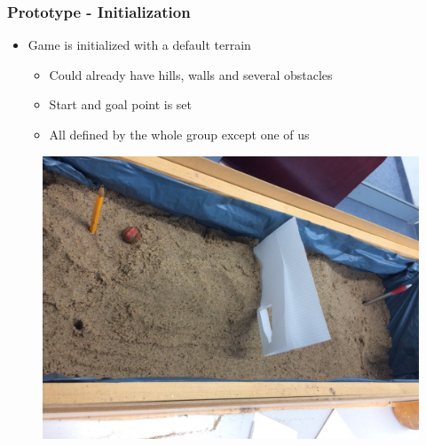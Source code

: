 \documentclass[xcolor=dvipsnames]{beamer}
\begin{document}
	\begin{frame}
		\frametitle{Prototype - Initialization}
		\begin{itemize}
			\setlength\itemsep{1.5em}
			\item Game is initialized with a default terrain
			\begin{itemize}
				\item Could already have hills, walls and several obstacles
				\item Start and goal point is set
				\item All defined by the whole group except one of us
			\end{itemize}
		\end{itemize}
		\begin{figure}[ht]
			\centering
			\includegraphics[scale=0.15]{images/prototype/prototypeTerrain2}
		\end{figure}
	\end{frame}
	
\end{document}
